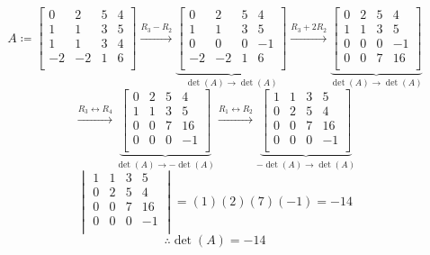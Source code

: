 \begin{eg}
    \[
        A\coloneqq \begin{bmatrix}
            0 &2  &5  &4   \\
             1&1  &3  &5   \\
             1&1  &3  &4   \\
             -2&-2  &1  &6   \\
        \end{bmatrix}\xrightarrow{R_3 -R_2}\underbrace{\begin{bmatrix}
            0 &2  &5  &4   \\
             1&1  &3  &5   \\
             0&0  &0  &-1   \\
             -2&-2  &1  &6   \\
        \end{bmatrix}}_{\det(A)\to \det(A)}\xrightarrow{R_3 +2R_2}\underbrace{\begin{bmatrix}
            0 &2  &5  &4   \\
             1&1  &3  &5   \\
             0&0  &0  &-1   \\
             0&0  &7  &16   \\
        \end{bmatrix}}_{\det(A)\to \det(A)}
    \]
    \[
        \xrightarrow{R_3 \leftrightarrow R_4}\underbrace{\begin{bmatrix}
            0 &2  &5  &4   \\
             1&1  &3  &5   \\
             0&0  &7  &16   \\
             0&0  &0  &-1   \\
        \end{bmatrix}}_{\det(A)\to -\det(A)}\xrightarrow{R_1 \leftrightarrow R_2}\underbrace{\begin{bmatrix}
             1&1  &3  &5   \\
             0&2  &5  &4   \\
             0&0  &7  &16   \\
             0&0  &0  &-1   \\
        \end{bmatrix}}_{-\det(A)\to \det(A)}
    \]
    \[
        \begin{vmatrix}
            1&1  &3  &5   \\
            0&2  &5  &4   \\
            0&0  &7  &16   \\
            0&0  &0  &-1   \\
        \end{vmatrix}=(1)(2)(7)(-1)=-14
    \]
    \[
        \therefore\det(A)=-14
    \]
\end{eg}
